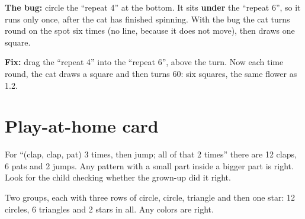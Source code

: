 \begin{answer}
\textbf{The bug:} circle the \enquote{repeat 4} at the bottom. It sits \textbf{under} the \enquote{repeat 6}, so it runs only once, after the cat has finished spinning. With the bug the cat turns round on the spot six times (no line, because it does not move), then draws one square.

\textbf{Fix:} drag the \enquote{repeat 4} into the \enquote{repeat 6}, above the turn. Now each time round, the cat draws a square and then turns 60: six squares, the same flower as 1.2.
\end{answer}

\section{Play-at-home card}
\begin{answer}
For \enquote{(clap, clap, pat) 3 times, then jump; all of that 2 times} there are 12 claps, 6 pats and 2 jumps. Any pattern with a small part inside a bigger part is right. Look for the child checking whether the grown-up did it right.
\end{answer}

\begin{answer}
Two groups, each with three rows of circle, circle, triangle and then one star: 12 circles, 6 triangles and 2 stars in all. Any colors are right.
\end{answer}
